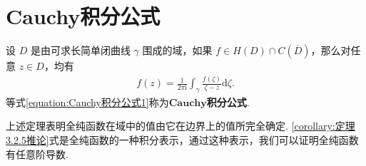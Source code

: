 \documentclass[../../main.tex]{subfiles}
\begin{document}
\section{Cauchy积分公式}

\begin{theorem}\label{theorem:定理3.4.1}
设 \( D \) 是由可求长简单闭曲线 \( \gamma \) 围成的域，如果 \( f \in H(D) \cap C(\overline{D}) \)，那么对任意 \( z \in D \)，均有
\begin{align}\label{equation:Cauchy积分公式1}
f(z) = \frac{1}{2\pi \mathrm{i}} \int_{\gamma} \frac{f(\zeta)}{\zeta - z} \mathrm{d}\zeta.
\end{align}
等式\eqref{equation:Cauchy积分公式1}称为$\mathbf{Cauchy}$\textbf{积分公式}.
\end{theorem}
\begin{note}
上述定理表明全纯函数在域中的值由它在边界上的值所完全确定. \eqref{corollary:定理3.2.5推论}式是全纯函数的一种积分表示，通过这种表示，我们可以证明全纯函数有任意阶导数.
\end{note}
\end{document}
